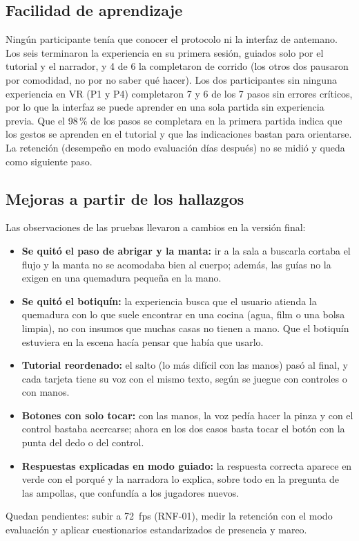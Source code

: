 \documentclass[11pt,a4paper]{article}
\begin{document}
\subsection{Facilidad de aprendizaje}
Ningún participante tenía que conocer el protocolo ni la interfaz de antemano. Los seis terminaron la experiencia en su primera sesión, guiados solo por el tutorial y el narrador, y 4 de 6 la completaron de corrido (los otros dos pausaron por comodidad, no por no saber qué hacer). Los dos participantes sin ninguna experiencia en VR (P1 y P4) completaron 7 y 6 de los 7 pasos sin errores críticos, por lo que la interfaz se puede aprender en una sola partida sin experiencia previa. Que el 98\,\% de los pasos se completara en la primera partida indica que los gestos se aprenden en el tutorial y que las indicaciones bastan para orientarse. La retención (desempeño en modo evaluación días después) no se midió y queda como siguiente paso.

\subsection{Mejoras a partir de los hallazgos}\label{sec:mejoras}
Las observaciones de las pruebas llevaron a cambios en la versión final:
\begin{itemize}
    \item \textbf{Se quitó el paso de abrigar y la manta:} ir a la sala a buscarla cortaba el flujo y la manta no se acomodaba bien al cuerpo; además, las guías no la exigen en una quemadura pequeña en la mano.
    \item \textbf{Se quitó el botiquín:} la experiencia busca que el usuario atienda la quemadura con lo que suele encontrar en una cocina (agua, film o una bolsa limpia), no con insumos que muchas casas no tienen a mano. Que el botiquín estuviera en la escena hacía pensar que había que usarlo.
    \item \textbf{Tutorial reordenado:} el salto (lo más difícil con las manos) pasó al final, y cada tarjeta tiene su voz con el mismo texto, según se juegue con controles o con manos.
    \item \textbf{Botones con solo tocar:} con las manos, la voz pedía hacer la pinza y con el control bastaba acercarse; ahora en los dos casos basta tocar el botón con la punta del dedo o del control.
    \item \textbf{Respuestas explicadas en modo guiado:} la respuesta correcta aparece en verde con el porqué y la narradora lo explica, sobre todo en la pregunta de las ampollas, que confundía a los jugadores nuevos.
\end{itemize}
Quedan pendientes: subir a 72~fps (RNF-01), medir la retención con el modo evaluación y aplicar cuestionarios estandarizados de presencia y mareo.
\end{document}
